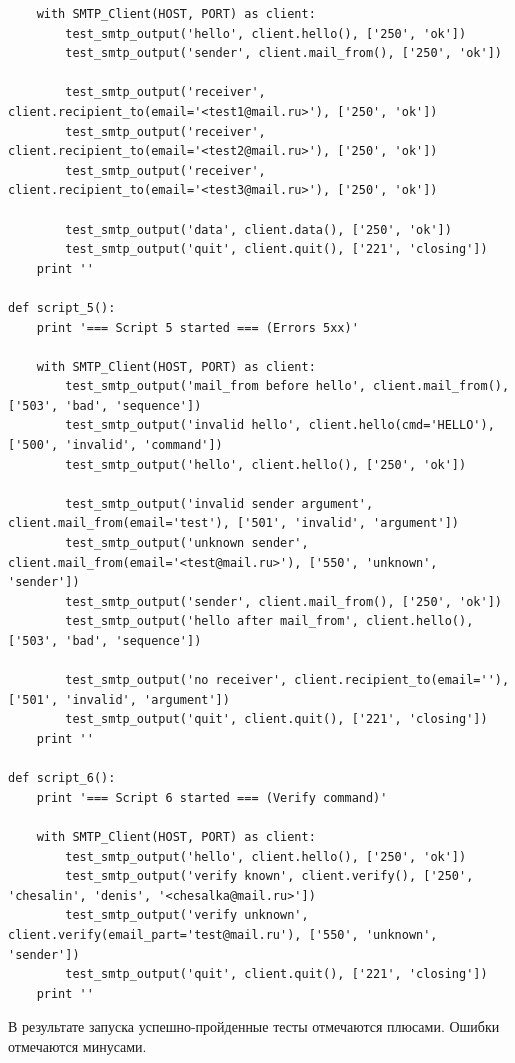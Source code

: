 \documentclass[a4paper,12pt]{report}
\begin{document}
\begin{verbatim}
    with SMTP_Client(HOST, PORT) as client:
        test_smtp_output('hello', client.hello(), ['250', 'ok'])
        test_smtp_output('sender', client.mail_from(), ['250', 'ok'])
        
        test_smtp_output('receiver', client.recipient_to(email='<test1@mail.ru>'), ['250', 'ok'])
        test_smtp_output('receiver', client.recipient_to(email='<test2@mail.ru>'), ['250', 'ok'])
        test_smtp_output('receiver', client.recipient_to(email='<test3@mail.ru>'), ['250', 'ok'])
        
        test_smtp_output('data', client.data(), ['250', 'ok'])
        test_smtp_output('quit', client.quit(), ['221', 'closing'])
    print ''

def script_5():
    print '=== Script 5 started === (Errors 5xx)'

    with SMTP_Client(HOST, PORT) as client:
        test_smtp_output('mail_from before hello', client.mail_from(), ['503', 'bad', 'sequence'])
        test_smtp_output('invalid hello', client.hello(cmd='HELLO'), ['500', 'invalid', 'command'])
        test_smtp_output('hello', client.hello(), ['250', 'ok'])

        test_smtp_output('invalid sender argument', client.mail_from(email='test'), ['501', 'invalid', 'argument'])
        test_smtp_output('unknown sender', client.mail_from(email='<test@mail.ru>'), ['550', 'unknown', 'sender'])
        test_smtp_output('sender', client.mail_from(), ['250', 'ok'])
        test_smtp_output('hello after mail_from', client.hello(), ['503', 'bad', 'sequence'])
        
        test_smtp_output('no receiver', client.recipient_to(email=''), ['501', 'invalid', 'argument'])
        test_smtp_output('quit', client.quit(), ['221', 'closing'])
    print ''

def script_6():
    print '=== Script 6 started === (Verify command)'

    with SMTP_Client(HOST, PORT) as client:
        test_smtp_output('hello', client.hello(), ['250', 'ok'])
        test_smtp_output('verify known', client.verify(), ['250', 'chesalin', 'denis', '<chesalka@mail.ru>'])
        test_smtp_output('verify unknown', client.verify(email_part='test@mail.ru'), ['550', 'unknown', 'sender'])
        test_smtp_output('quit', client.quit(), ['221', 'closing'])
    print ''
\end{verbatim}

В результате запуска успешно-пройденные тесты отмечаются плюсами. Ошибки отмечаются минусами.
\end{document}
